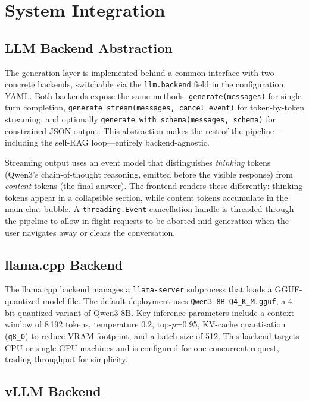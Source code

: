 \chapter{System Integration}

\section{LLM Backend Abstraction}

The generation layer is implemented behind a common interface with two concrete backends, switchable via the \texttt{llm.backend} field in the configuration YAML. Both backends expose the same methods: \texttt{generate(messages)} for single-turn completion, \texttt{generate\_stream(messages, cancel\_event)} for token-by-token streaming, and optionally \texttt{generate\_with\_schema(messages, schema)} for constrained JSON output. This abstraction makes the rest of the pipeline---including the self-RAG loop---entirely backend-agnostic.

Streaming output uses an event model that distinguishes \emph{thinking} tokens (Qwen3's chain-of-thought reasoning, emitted before the visible response) from \emph{content} tokens (the final answer). The frontend renders these differently: thinking tokens appear in a collapsible section, while content tokens accumulate in the main chat bubble. A \texttt{threading.Event} cancellation handle is threaded through the pipeline to allow in-flight requests to be aborted mid-generation when the user navigates away or clears the conversation.

\section{llama.cpp Backend}

The llama.cpp backend \parencite{llamacpp} manages a \texttt{llama-server} subprocess that loads a GGUF-quantized model file. The default deployment uses \texttt{Qwen3-8B-Q4\_K\_M.gguf}, a 4-bit quantized variant of Qwen3-8B. Key inference parameters include a context window of 8\,192 tokens, temperature 0.2, top-$p$=0.95, KV-cache quantisation (\texttt{q8\_0}) to reduce VRAM footprint, and a batch size of 512. This backend targets CPU or single-GPU machines and is configured for one concurrent request, trading throughput for simplicity.

\section{vLLM Backend}

